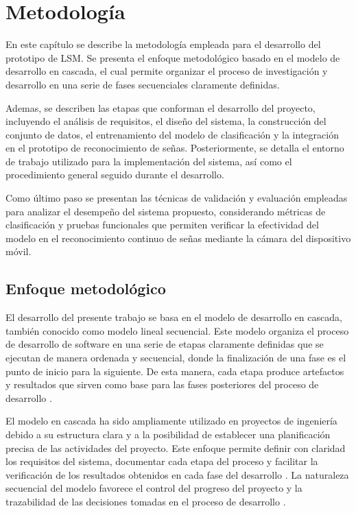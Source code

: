 	\section{Metodología}
	
	En este capítulo se describe la metodología empleada para el desarrollo del prototipo de LSM. Se presenta el enfoque metodológico basado en el modelo de desarrollo en cascada, el cual permite organizar el proceso de investigación y desarrollo en una serie de fases secuenciales claramente definidas.
	
	Ademas, se describen las etapas que conforman el desarrollo del proyecto, incluyendo el análisis de requisitos, el diseño del sistema, la construcción del conjunto de datos, el entrenamiento del modelo de clasificación y la integración en el prototipo de reconocimiento de señas. Posteriormente, se detalla el entorno de trabajo utilizado para la implementación del sistema, así como el procedimiento general seguido durante el desarrollo.
	
	Como último paso se presentan las técnicas de validación y evaluación empleadas para analizar el desempeño del sistema propuesto, considerando métricas de clasificación y pruebas funcionales que permiten verificar la efectividad del modelo en el reconocimiento continuo de señas mediante la cámara del dispositivo móvil.
	
	
	\subsection{Enfoque metodológico}
	
	El desarrollo del presente trabajo se basa en el modelo de desarrollo en cascada,
	también conocido como modelo lineal secuencial. Este modelo organiza el proceso
	de desarrollo de software en una serie de etapas claramente definidas que se
	ejecutan de manera ordenada y secuencial, donde la finalización de una fase es el punto de inicio para la siguiente. De esta manera, cada etapa
	produce artefactos y resultados que sirven como base para las fases posteriores
	del proceso de desarrollo \cite{pressman2014,sommerville2016}.
	
	El modelo en cascada ha sido ampliamente utilizado en proyectos de ingeniería debido a su estructura clara y a la posibilidad de establecer una
	planificación precisa de las actividades del proyecto. Este enfoque permite
	definir con claridad los requisitos del sistema, documentar cada etapa del
	proceso y facilitar la verificación de los resultados obtenidos en cada fase
	del desarrollo \cite{mall2018,jalote2005}. La naturaleza secuencial
	del modelo favorece el control del progreso del proyecto y la trazabilidad de
	las decisiones tomadas en el proceso de desarrollo \cite{fairley1985}.
	
